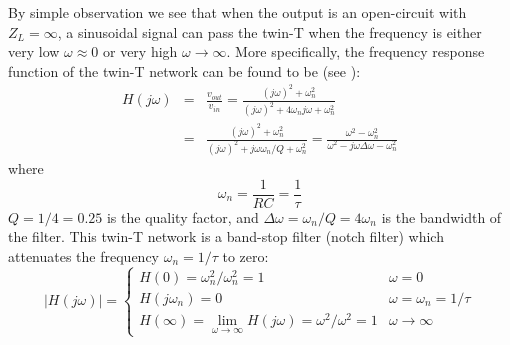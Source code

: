 \documentclass{article}
\begin{document}
\begin{comment}

As these two $\pi$-networks are combined in parallel, they form a single
$\pi$-network with three branches $Z_1=Z'_1||Z''_1$, $Z_2=Z'_2||Z''_2$, 
and $Z_3=Z'_3||Z''_3$:
\begin{equation}
Z_1=Z'_1||Z''_1=Z_2=Z'_2||Z''_2=\frac{1}{2}\left(R+\frac{1}{j\omega C}\right)
\end{equation}
\begin{equation}
  Z_3=Z'_3||Z''_3=\frac{Z'_3 Z''_3}{Z'_3+Z''_3}
  =\frac{2R(1+j\omega RC)}{1+(j\omega RC)^2}
\end{equation}
The frequency response function of this $\pi$-network (a voltage divider) is:
\begin{eqnarray}
  H(j\omega)&=&\frac{Z_2}{Z_2+Z_3}=\frac{R+1/j\omega C}
  {R+1/j\omega C+4R(1+j\omega RC)/(1+(j\omega RC)^2)}
  \nonumber \\
  &=&\frac{(1+j\omega RC)/j\omega C}{(1+j\omega RC)/j\omega C+4R(1+j\omega RC)/(1+(j\omega RC)^2)}
  \nonumber \\
  &=&\frac{1/j\omega C}{1/j\omega C+4R/(1+(j\omega RC)^2)}
  =\frac{1}{1+4j\omega RC/(1+(j\omega RC)^2)}
  \nonumber \\
  &=&\frac{1+(j\omega\tau)^2}{1+(j\omega\tau)^2+4j\omega\tau}
  =\frac{(j\omega)^2+(1/\tau)^2}{(j\omega)^2+4j\omega/\tau+(1/\tau)^2}
\end{eqnarray}

\end{comment}

By simple observation we see that when the output is an open-circuit with 
$Z_L=\infty$, a sinusoidal signal can pass the twin-T when the frequency 
is either very low $\omega\approx 0$ or very high $\omega\rightarrow\infty$. 
More specifically, the frequency response function of the twin-T network 
can be found to be (see ):
\begin{eqnarray}
  H(j\omega)&=&\frac{v_{out}}{v_{in}}
  =\frac{(j\omega)^2+\omega_n^2}{(j\omega)^2+4\omega_nj\omega+\omega_n^2}
  \nonumber\\
  &=&\frac{(j\omega)^2+\omega_n^2}{(j\omega)^2+j\omega\omega_n/Q+\omega_n^2}
  =\frac{\omega^2-\omega_n^2}{\omega^2-j\omega\Delta\omega-\omega_n^2}
\end{eqnarray}
where
\begin{equation}
\omega_n=\frac{1}{RC}=\frac{1}{\tau}
\end{equation}
$Q=1/4=0.25$ is the quality factor, and $\Delta\omega=\omega_n/Q=4\omega_n$ 
is the bandwidth of the filter. This twin-T network is a band-stop filter 
(notch filter) which attenuates the frequency $\omega_n=1/\tau$ to zero:
\begin{equation}
|H(j\omega)|=\left\{\begin{array}{ll} 
H(0)=\omega_n^2/\omega_n^2=1 & \omega=0 \\
H(j\omega_n)=0 & \omega=\omega_n=1/\tau\\
H(\infty)=\lim\limits_{\omega\rightarrow\infty}H(j\omega)=\omega^2/\omega^2=1 & \omega\rightarrow \infty
\end{array}\right.
\end{equation}
\end{document}
